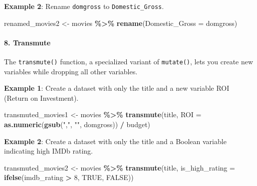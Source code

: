 \documentclass[
]{book}
\newenvironment{Shaded}{\begin{snugshade}}{\end{snugshade}}
\newcommand{\AttributeTok}[1]{\textcolor[rgb]{0.13,0.29,0.53}{#1}}
\newcommand{\ConstantTok}[1]{\textcolor[rgb]{0.56,0.35,0.01}{#1}}
\newcommand{\DecValTok}[1]{\textcolor[rgb]{0.00,0.00,0.81}{#1}}
\newcommand{\FunctionTok}[1]{\textcolor[rgb]{0.13,0.29,0.53}{\textbf{#1}}}
\newcommand{\NormalTok}[1]{#1}
\newcommand{\OtherTok}[1]{\textcolor[rgb]{0.56,0.35,0.01}{#1}}
\newcommand{\SpecialCharTok}[1]{\textcolor[rgb]{0.81,0.36,0.00}{\textbf{#1}}}
\newcommand{\StringTok}[1]{\textcolor[rgb]{0.31,0.60,0.02}{#1}}
\begin{document}
\textbf{Example 2}: Rename \texttt{domgross} to \texttt{Domestic\_Gross}.

\begin{Shaded}
\begin{Highlighting}[]
\NormalTok{renamed\_movies2 }\OtherTok{\textless{}{-}}\NormalTok{ movies }\SpecialCharTok{\%\textgreater{}\%}
  \FunctionTok{rename}\NormalTok{(}\AttributeTok{Domestic\_Gross =}\NormalTok{ domgross)}
\end{Highlighting}
\end{Shaded}

\hypertarget{transmute}{%
\paragraph*{8. Transmute}\label{transmute}}

The \texttt{transmute()} function, a specialized variant of \texttt{mutate()}, lets you create new variables while dropping all other variables.

\textbf{Example 1}: Create a dataset with only the title and a new variable ROI (Return on Investment).

\begin{Shaded}
\begin{Highlighting}[]
\NormalTok{transmuted\_movies1 }\OtherTok{\textless{}{-}}\NormalTok{ movies }\SpecialCharTok{\%\textgreater{}\%}
  \FunctionTok{transmute}\NormalTok{(title, }\AttributeTok{ROI =} \FunctionTok{as.numeric}\NormalTok{(}\FunctionTok{gsub}\NormalTok{(}\StringTok{","}\NormalTok{, }\StringTok{""}\NormalTok{, domgross)) }\SpecialCharTok{/}\NormalTok{ budget)}
\end{Highlighting}
\end{Shaded}

\textbf{Example 2}: Create a dataset with only the title and a Boolean variable indicating high IMDb rating.

\begin{Shaded}
\begin{Highlighting}[]
\NormalTok{transmuted\_movies2 }\OtherTok{\textless{}{-}}\NormalTok{ movies }\SpecialCharTok{\%\textgreater{}\%}
  \FunctionTok{transmute}\NormalTok{(title, }\AttributeTok{is\_high\_rating =} \FunctionTok{ifelse}\NormalTok{(imdb\_rating }\SpecialCharTok{\textgreater{}} \DecValTok{8}\NormalTok{, }\ConstantTok{TRUE}\NormalTok{, }\ConstantTok{FALSE}\NormalTok{))}
\end{Highlighting}
\end{Shaded}
\end{document}

